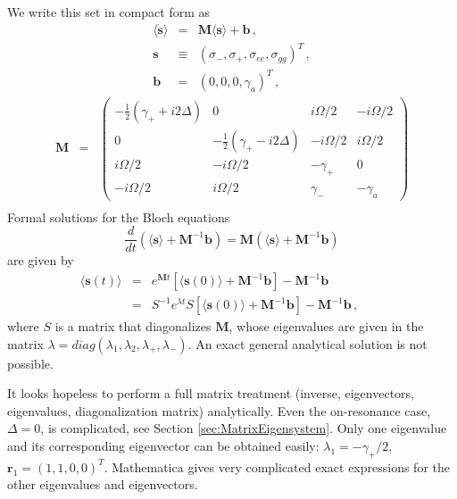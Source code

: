 \documentclass[twocolumn,aps,eqsecnum,showkeys,amsmath]{revtex4-2}
\begin{document}
We write this set in compact form as 
%
\begin{subequations}
\begin{eqnarray}
\langle \dot{\mathbf{s}} \rangle 
	&=& \mathbf{M} \langle \mathbf{s} \rangle +\mathbf{b} 	\,, \\ 
\mathbf{s} &\equiv&   
	\left( \sigma_-,  \sigma_+, \sigma_{ee}, \sigma_{gg}  \right)^T 	\,, \\ 
\mathbf{b} &=& (0,0,0,\gamma_a)^T 	\,,  
\end{eqnarray}
\end{subequations}
%
\begin{eqnarray} 	\label{eq:matrixM}
\mathbf{M} &=& \left( \begin{array}{cccc}
-\frac{1}{2}(\gamma_+ +i2\Delta) & 0 & i\Omega/2 & -i\Omega/2 \\ 
0 & -\frac{1}{2}(\gamma_+ -i2\Delta) & -i\Omega/2 & i\Omega/2 	 \\ 
i\Omega/2 & -i\Omega/2 & -\gamma_+ & 0 		\\ 
-i\Omega/2 & i\Omega/2 & \gamma_- & -\gamma_a 
\end{array}  \right) 	\nonumber \\ 
\end{eqnarray}
Formal solutions for the Bloch equations 
%
\begin{equation}
\frac{d}{dt} \left( \langle \mathbf{s} \rangle 
	+\mathbf{M}^{-1} \mathbf{b} \right) = 
\mathbf{M} \left( \langle \mathbf{s} \rangle 
	+\mathbf{M}^{-1}\mathbf{b} \right) 	
\end{equation}
are given by 
%
\begin{eqnarray}
\langle \mathbf{s}(t) \rangle &=& e^{\mathbf{M} t} \left[ 
 	\langle \mathbf{s}(0) \rangle +\mathbf{M}^{-1} \mathbf{b} \right] 
	-\mathbf{M}^{-1} \mathbf{b} 	\\
&=& S^{-1} e^{\lambda t} S \left[ 
	\langle \mathbf{s}(0) \rangle +\mathbf{M}^{-1} \mathbf{b} \right] 
	-\mathbf{M}^{-1} \mathbf{b} 	\,, \nonumber \qquad
\end{eqnarray}
where $S$ is a matrix that diagonalizes $\mathbf{M}$, whose 
eigenvalues are given in the matrix 
$\lambda= diag(\lambda_1, \lambda_2, \lambda_+, \lambda_-)$. 
An exact general analytical solution is not possible. 

It looks hopeless to perform a full matrix treatment (inverse, eigenvectors, 
eigenvalues, diagonalization matrix) analytically. Even the on-resonance 
case, $\Delta=0$, is complicated, see Section \ref{sec:MatrixEigensystem}. 
Only one eigenvalue and its corresponding eigenvector can be obtained 
easily: $\lambda_1 =-\gamma_+/2$, $\mathbf{r}_1 =(1,1,0,0)^T$. 
Mathematica gives very complicated exact expressions for the other 
eigenvalues and eigenvectors.
\end{document}
